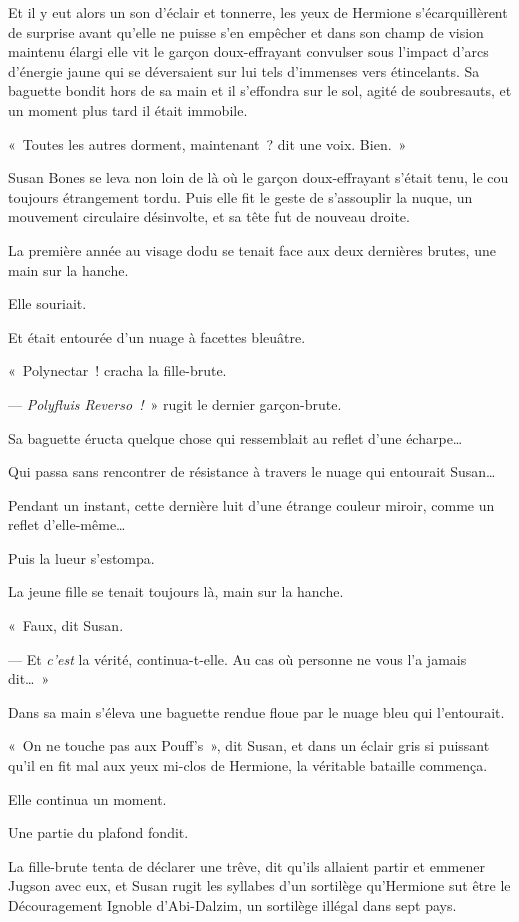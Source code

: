 Et il y eut alors un son d'éclair et tonnerre, les yeux de Hermione s'écarquillèrent de surprise avant qu'elle ne puisse s'en empêcher et dans son champ de vision maintenu élargi elle vit le garçon doux-effrayant convulser sous l'impact d'arcs d'énergie jaune qui se déversaient sur lui tels d'immenses vers étincelants. Sa baguette bondit hors de sa main et il s'effondra sur le sol, agité de soubresauts, et un moment plus tard il était immobile.

«~Toutes les autres dorment, maintenant~? dit une voix. Bien.~»

Susan Bones se leva non loin de là où le garçon doux-effrayant s'était tenu, le cou toujours étrangement tordu. Puis elle fit le geste de s'assouplir la nuque, un mouvement circulaire désinvolte, et sa tête fut de nouveau droite.

La première année au visage dodu se tenait face aux deux dernières brutes, une main sur la hanche.

Elle souriait.

Et était entourée d'un nuage à facettes bleuâtre.

«~Polynectar~! cracha la fille-brute.

--- \emph{Polyfluis Reverso~!}~» rugit le dernier garçon-brute.

Sa baguette éructa quelque chose qui ressemblait au reflet d'une écharpe…

Qui passa sans rencontrer de résistance à travers le nuage qui entourait Susan…

Pendant un instant, cette dernière luit d'une étrange couleur miroir, comme un reflet d'elle-même…

Puis la lueur s'estompa.

La jeune fille se tenait toujours là, main sur la hanche.

«~Faux, dit Susan.

--- Et \emph{c'est} la vérité, continua-t-elle. Au cas où personne ne vous l'a jamais dit…~»

Dans sa main s'éleva une baguette rendue floue par le nuage bleu qui l'entourait.

«~On ne touche pas aux Pouff's~», dit Susan, et dans un éclair gris si puissant qu'il en fit mal aux yeux mi-clos de Hermione, la véritable bataille commença.

Elle continua un moment.

Une partie du plafond fondit.

La fille-brute tenta de déclarer une trêve, dit qu'ils allaient partir et emmener Jugson avec eux, et Susan rugit les syllabes d'un sortilège qu'Hermione sut être le Découragement Ignoble d'Abi-Dalzim, un sortilège illégal dans sept pays.

